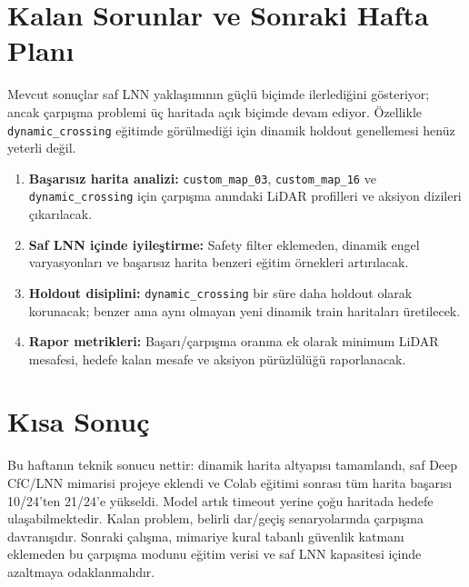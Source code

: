 \documentclass[11pt,a4paper]{article}
\newcommand{\code}[1]{\texttt{#1}}
\begin{document}
\section{Kalan Sorunlar ve Sonraki Hafta Planı}

Mevcut sonuçlar saf LNN yaklaşımının güçlü biçimde ilerlediğini gösteriyor;
ancak çarpışma problemi üç haritada açık biçimde devam ediyor. Özellikle
\code{dynamic\_crossing} eğitimde görülmediği için dinamik holdout genellemesi
henüz yeterli değil.

\begin{enumerate}
  \item \textbf{Başarısız harita analizi:} \code{custom\_map\_03},
  \code{custom\_map\_16} ve \code{dynamic\_crossing} için çarpışma anındaki
  LiDAR profilleri ve aksiyon dizileri çıkarılacak.
  \item \textbf{Saf LNN içinde iyileştirme:} Safety filter eklemeden,
  dinamik engel varyasyonları ve başarısız harita benzeri eğitim örnekleri
  artırılacak.
  \item \textbf{Holdout disiplini:} \code{dynamic\_crossing} bir süre daha
  holdout olarak korunacak; benzer ama aynı olmayan yeni dinamik train haritaları
  üretilecek.
  \item \textbf{Rapor metrikleri:} Başarı/çarpışma oranına ek olarak minimum
  LiDAR mesafesi, hedefe kalan mesafe ve aksiyon pürüzlülüğü raporlanacak.
\end{enumerate}

\section{Kısa Sonuç}

Bu haftanın teknik sonucu nettir: dinamik harita altyapısı tamamlandı, saf
Deep CfC/LNN mimarisi projeye eklendi ve Colab eğitimi sonrası tüm harita
başarısı 10/24'ten 21/24'e yükseldi. Model artık timeout yerine çoğu haritada
hedefe ulaşabilmektedir. Kalan problem, belirli dar/geçiş senaryolarında
çarpışma davranışıdır. Sonraki çalışma, mimariye kural tabanlı güvenlik katmanı
eklemeden bu çarpışma modunu eğitim verisi ve saf LNN kapasitesi içinde
azaltmaya odaklanmalıdır.
\end{document}
